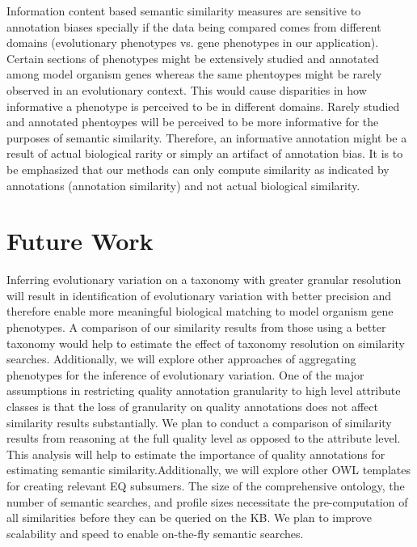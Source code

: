 \documentclass{article}
\begin{document}
Information content based semantic similarity measures are sensitive to annotation biases specially if the data being compared comes from different domains (evolutionary phenotypes vs. gene phenotypes in our application). Certain sections of phenotypes might be extensively studied and annotated among model organism genes whereas the same phentoypes might be rarely observed in an evolutionary context. This would cause disparities in how informative a phenotype is perceived to be in different domains. Rarely studied and annotated phentoypes will be perceived to be more informative for the purposes of semantic similarity. Therefore, an informative annotation might be a result of actual biological rarity or simply an artifact of annotation bias. It is to be emphasized that our methods can only compute similarity as indicated by annotations (annotation similarity) and not actual biological similarity.

\section{Future Work}
Inferring evolutionary variation on a taxonomy with greater granular resolution will result in identification of evolutionary variation with better precision and therefore enable more meaningful biological matching to model organism gene phenotypes. A comparison of our similarity results from those using a better taxonomy would help to estimate the effect of taxonomy resolution on similarity searches. Additionally, we will explore other approaches of aggregating phenotypes for the inference of evolutionary variation. One of the major assumptions in restricting quality annotation granularity to high level attribute classes is that the loss of granularity on quality annotations does not affect similarity results substantially. We plan to conduct a comparison of similarity results from reasoning at the full quality level as opposed to the attribute level. This analysis will help to estimate the importance of quality annotations for estimating semantic similarity.Additionally, we will explore other OWL templates for creating relevant EQ subsumers. The size of the comprehensive ontology, the number of semantic searches, and profile sizes necessitate the pre-computation of all similarities before they can be queried on the KB. We plan to improve scalability and speed to enable on-the-fly semantic searches. 
\end{document}
